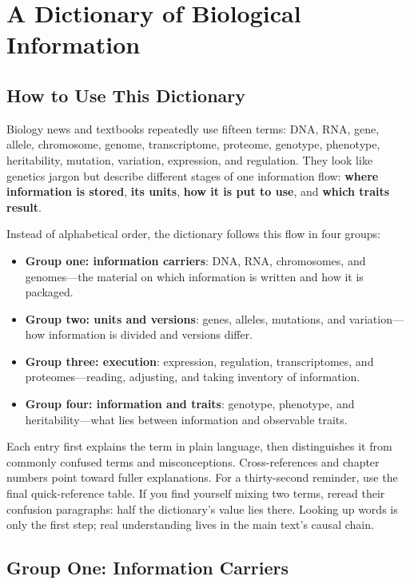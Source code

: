 \chapter{A Dictionary of Biological Information}

\section*{How to Use This Dictionary}

Biology news and textbooks repeatedly use fifteen terms: DNA, RNA, gene, allele, chromosome, genome, transcriptome, proteome, genotype, phenotype, heritability, mutation, variation, expression, and regulation. They look like genetics jargon but describe different stages of one information flow: \textbf{where information is stored}, \textbf{its units}, \textbf{how it is put to use}, and \textbf{which traits result}.

Instead of alphabetical order, the dictionary follows this flow in four groups:

\begin{itemize}[itemsep=2pt]
\item \textbf{Group one: information carriers}: DNA, RNA, chromosomes, and genomes---the material on which information is written and how it is packaged.
\item \textbf{Group two: units and versions}: genes, alleles, mutations, and variation---how information is divided and versions differ.
\item \textbf{Group three: execution}: expression, regulation, transcriptomes, and proteomes---reading, adjusting, and taking inventory of information.
\item \textbf{Group four: information and traits}: genotype, phenotype, and heritability---what lies between information and observable traits.
\end{itemize}

Each entry first explains the term in plain language, then distinguishes it from commonly confused terms and misconceptions. Cross-references and chapter numbers point toward fuller explanations. For a thirty-second reminder, use the final quick-reference table. If you find yourself mixing two terms, reread their confusion paragraphs: half the dictionary's value lies there. Looking up words is only the first step; real understanding lives in the main text's causal chain.

\section{Group One: Information Carriers}

